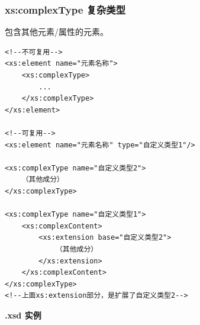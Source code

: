 \documentclass[fontset=windows]{article}
\begin{document}
\subsubsection{xs:complexType 复杂类型}

包含其他元素/属性的元素。

\begin{verbatim}
<!--不可复用-->
<xs:element name="元素名称">
	<xs:complexType>
		...
	</xs:complexType>
</xs:element>

<!--可复用-->
<xs:element name="元素名称" type="自定义类型1"/> 

<xs:complexType name="自定义类型2">        
	（其他成分） 
</xs:complexType>  

<xs:complexType name="自定义类型1">          
	<xs:complexContent>                   
		<xs:extension base="自定义类型2">                            
			（其他成分）              
 		</xs:extension>         
 	</xs:complexContent> 
</xs:complexType>
<!--上面xs:extension部分，是扩展了自定义类型2-->
\end{verbatim}

\noindent\textbf{.xsd 实例}
\end{document}
